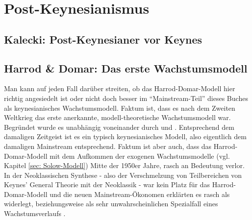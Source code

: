 %
%
%

\chapter{Post-Keynesianismus}
\label{Post-Keynes}


\section{Kalecki: Post-Keynesianer vor Keynes}

\section{Harrod \& Domar: Das erste Wachstumsmodell}
Man kann auf jeden Fall darüber streiten, ob das Harrod-Domar-Modell hier richtig angesiedelt ist oder nicht doch besser im "`Mainstream-Teil"' dieses Buches als keynesianisches Wachstumsmodell. Faktum ist, dass es nach dem Zweiten Weltkrieg das erste anerkannte, modell-theoretische Wachstumsmodell war. Begründet wurde es unabhängig voneinander durch \textcite{Harrod1939} und \textcite{Domar1946, Domar1947}. Entsprechend dem damaligen Zeitgeist ist es ein typisch keynesianisches Modell, also eigentlich dem damaligen Mainstream entsprechend. Faktum ist aber auch, dass das Harrod-Domar-Modell mit dem Aufkommen der exogenen Wachstumsmodelle (vgl. Kapitel \ref{sec: Solow-Modell}) Mitte der 1950er Jahre, rasch an Bedeutung verlor. In der Neoklassischen Synthese - also der Verschmelzung von Teilbereichen von Keynes' General Theorie mit der Neoklassik - war kein Platz für das Harrod-Domar-Modell und die neuen Mainstream-Ökonomen erklärten es rasch als widerlegt, beziehungsweise als sehr unwahrscheinlichen Spezialfall eines Wachstumsverlaufs \parencite{Solow1987}. 


